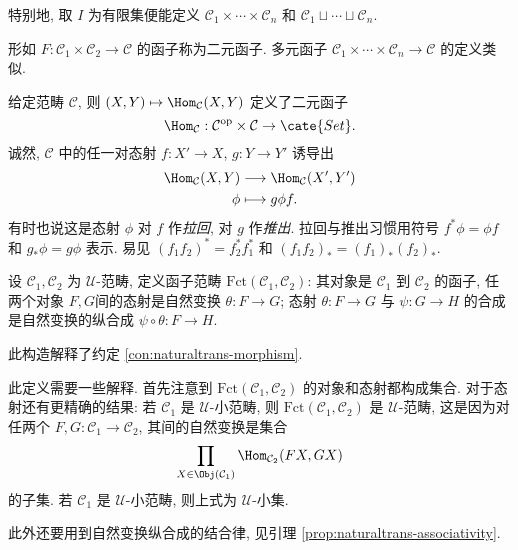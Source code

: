 特别地, 取 $I$ 为有限集便能定义 $\mathcal{C}_1 \times \cdots \times \mathcal{C}_n$ 和 $\mathcal{C}_1 \sqcup \cdots \sqcup \mathcal{C}_n$.

\begin{definition}
	形如 $F: \mathcal{C}_1 \times \mathcal{C}_2 \to \mathcal{C}$ 的函子称为二元函子. 多元函子 $\mathcal{C}_1 \times \cdots \times \mathcal{C}_n \to \mathcal{C}$ 的定义类似.
\end{definition}

\begin{example}[$\Hom$ 函子]\label{eg:Hom-functor} 
	给定范畴 $\mathcal{C}$, 则 $(X,Y) \mapsto \Hom_{\mathcal{C}}(X, Y)$ 定义了二元函子
	\[ \Hom_{\mathcal{C}}: \mathcal{C}^\text{op} \times \mathcal{C}  \to \cate{Set}. \]
	诚然, $\mathcal{C}$ 中的任一对态射 $f: X' \to X$, $g: Y \to Y'$ 诱导出
	\begin{align*}
		\Hom_{\mathcal{C}}(X, Y) & \longrightarrow \Hom_{\mathcal{C}}(X', Y') \\
		\phi & \longmapsto g \phi f .
	\end{align*}
	有时也说这是态射 $\phi$ 对 $f$ 作\emph{拉回}, 对 $g$ 作\emph{推出}. 拉回与推出习惯用符号 $f^* \phi = \phi f$ 和 $g_* \phi = g\phi$ 表示.
	易见 $(f_1 f_2)^* = f_2^* f_1^*$ 和 $(f_1 f_2)_* = (f_1)_* (f_2)_*$.
\end{example}

\begin{definition}[函子范畴]
	设 $\mathcal{C}_1, \mathcal{C}_2$ 为 $\mathcal{U}$-范畴, 定义函子范畴 $\text{Fct}(\mathcal{C}_1, \mathcal{C}_2)$: 其对象是 $\mathcal{C}_1$ 到 $\mathcal{C}_2$ 的函子, 任两个对象 $F, G$间的态射是自然变换 $\theta: F \to G$; 态射 $\theta: F \to G$ 与 $\psi: G \to H$ 的合成是自然变换的纵合成 $\psi \circ \theta: F \to H$.
\end{definition}
此构造解释了约定 \ref{con:naturaltrans-morphism}.

\begin{remark}
	此定义需要一些解释. 首先注意到 $\text{Fct}(\mathcal{C}_1, \mathcal{C}_2)$ 的对象和态射都构成集合. 对于态射还有更精确的结果: 若 $\mathcal{C}_1$ 是 $\mathcal{U}$-小范畴, 则 $\text{Fct}(\mathcal{C}_1, \mathcal{C}_2)$ 是 $\mathcal{U}$-范畴, 这是因为对任两个 $F, G: \mathcal{C}_1 \to \mathcal{C}_2$, 其间的自然变换是集合
	\[ \prod_{X \in \Obj(\mathcal{C}_1)} \Hom_{\mathcal{C}_2} (FX, GX) \]
	的子集. 若 $\mathcal{C}_1$ 是 $\mathcal{U}$-小范畴, 则上式为 $\mathcal{U}$-小集.

	此外还要用到自然变换纵合成的结合律, 见引理 \ref{prop:naturaltrans-associativity}.
\end{remark}

